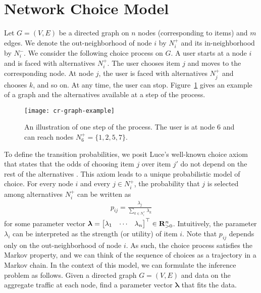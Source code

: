 \section{Network Choice Model}  %
\label{sec:model}

Let $G = (V,E)$ be a directed graph on $n$ nodes (corresponding to items) and $m$ edges.
We denote the out-neighborhood of node $i$ by $N^+_i$ and its in-neighborhood by $N^-_i$.
We consider the following choice process on $G$.
A user starts at a node $i$ and is faced with alternatives $N^+_i$.
The user chooses item $j$ and moves to the corresponding node.
At node $j$, the user is faced with alternatives $N^+_j$ and chooses $k$, and so on.
At any time, the user can stop.
Figure~\ref{fig:samplenet} gives an example of a graph and the alternatives available at a step of the process.

\begin{figure}[t]
  \centering
  \texttt{[image: cr-graph-example]}
  \caption{An illustration of one step of the process.
  The user is at node 6 and can reach nodes $N^+_6 = \{1, 2, 5, 7\}$.}
  \label{fig:samplenet}
\end{figure}

To define the transition probabilities, we posit Luce's well-known choice axiom that states that the odds of choosing item $j$ over item $j'$ do not depend on the rest of the alternatives \citep{luce1959individual}.
This axiom leads to a unique probabilistic model of choice.
For every node $i$ and every $j \in N^+_i$, the probability that $j$ is selected among alternatives $N^+_i$ can be written as
\begin{align}
\label{eq:singlelik}
p_{ij} = \frac{\lambda_j}{\sum_{k \in N^+_i} \lambda_k}
\end{align}
for some parameter vector $\bm{\lambda} = \begin{bmatrix}\lambda_1 & \cdots & \lambda_n \end{bmatrix}^\top \in \mathbf{R}_{>0}^n$.
Intuitively, the parameter $\lambda_i$ can be interpreted as the strength (or utility) of item $i$.
Note that $p_{ij}$ depends only on the out-neighborhood of node $i$.
As such, the choice process satisfies the Markov property, and we can think of the sequence of choices as a trajectory in a Markov chain.
In the context of this model, we can formulate the inference problem as follows.
Given a directed graph $G = (V, E)$ and data on the aggregate traffic at each node, find a parameter vector $\bm{\lambda}$ that fits the data.
